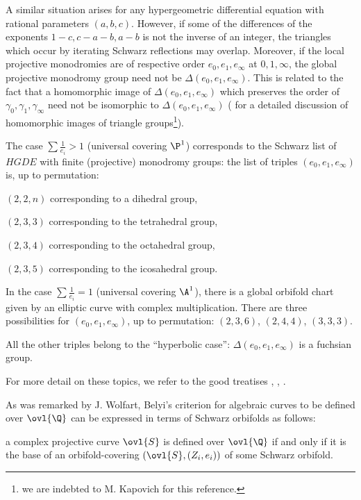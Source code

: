 \begin{para}\label{para::5.1.4} A similar situation arises for any
 hypergeometric differential equation with rational parameters
 $(a,b,c)$.  However, if some of the differences of the exponents
$1-c,c-a-b,a-b$ is not the inverse of an integer, the triangles which
occur by iterating Schwarz reflections may overlap. Moreover, if the
local projective monodromies are of respective order $e_0, e_1,
e_\infty$ at $0,1,\infty$, the global projective monodromy group need
not be $\Delta(e_0,e_1,e_\infty)$. This is related to the fact that a
homomorphic image of $\Delta(e_0,e_1,e_\infty)$ which preserves the
order of $\gamma_0,\gamma_1,\gamma_\infty$ need not be isomorphic to
$\Delta(e_0,e_1,e_\infty)$ (\cf \cite{greenberg81:_homom_psl} for a
detailed discussion 
of homomorphic images of triangle groups\footnote{we are indebted to
M. Kapovich for this reference.}).
\end{para}

\begin{para}\label{para::5.1.5} The case $\sum  \frac{1}{e_i}>1$ (universal
 covering $\P^1$) corresponds to the Schwarz list of $HGDE$ with finite
 (projective) monodromy groups: the list of triples
 $(e_0,e_1,e_\infty)$ is, up to permutation:

 \medskip
 $(2,2,n)$ corresponding to a dihedral group,

 $(2,3,3)$ corresponding to the tetrahedral group,

$(2,3,4)$ corresponding to the octahedral group,

 $(2,3,5)$ corresponding to the icosahedral group.
 
 \medskip In the case $\sum  \frac{1}{e_i}=1$ (universal covering $\A^1$), there is a global orbifold chart given by an elliptic curve with complex
 multiplication. There are three possibilities for $(e_0,e_1,e_\infty)$, up to permutation:
 $(2,3,6)$,
 $(2,4,4)$,
 $(3,3,3)$.
 
 \medskip All the other triples belong to the ``hyperbolic case'':
 $\Delta(e_0,e_1,e_\infty)$ is a fuchsian group.
 
 For more detail on these topics, we refer to the  good treatises
 \cite{f2}, \cite{ntatg}, \cite{hfml}.

\end{para}

\begin{para}\label{para::5.1.6} As was remarked by J. Wolfart, Belyi's
 criterion for algebraic curves to be defined over $\ovl{\Q}$ can be
 expressed in terms of Schwarz orbifolds as follows:

 a complex projective curve $\ovl{S}$ is defined over $\ovl{\Q}$ if and
 only if it is the base of an orbifold-covering $(\ovl{S}, (Z_i,e_i))$
 of some Schwarz orbifold.
\end{para}


